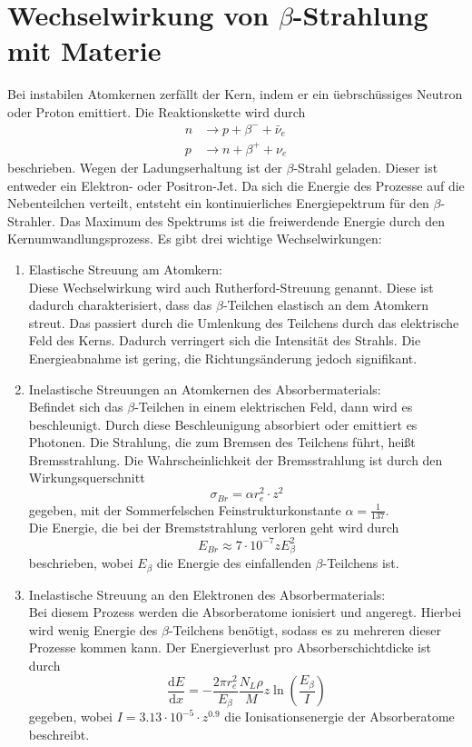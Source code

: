 \section{Wechselwirkung von $\beta$-Strahlung mit Materie}
Bei instabilen Atomkernen zerfällt der Kern, indem er ein üebrschüssiges Neutron oder Proton emittiert. Die Reaktionskette wird durch
\begin{align*}
  n &\rightarrow p+\beta^- + \bar\nu_e\\
  p &\rightarrow n+\beta^+ + \nu_e
\end{align*}
beschrieben. Wegen der Ladungserhaltung ist der $\beta$-Strahl geladen. Dieser ist entweder ein Elektron- oder Positron-Jet. Da sich die Energie des Prozesse auf die Nebenteilchen verteilt, entsteht ein kontinuierliches Energiepektrum für den $\beta$-Strahler. Das Maximum des Spektrums ist die freiwerdende Energie durch den Kernumwandlungsprozess. Es gibt drei wichtige Wechselwirkungen:
\begin{enumerate}[nosep,label=\textsc{\arabic*},leftmargin=*]
\item Elastische Streuung am Atomkern:\\
Diese Wechselwirkung wird auch Rutherford-Streuung genannt. Diese ist dadurch charakterisiert, dass das $\beta$-Teilchen elastisch an dem Atomkern streut. Das passiert durch die Umlenkung des Teilchens durch das elektrische Feld des Kerns. Dadurch verringert sich die Intensität des Strahls. Die Energieabnahme ist gering, die Richtungsänderung jedoch signifikant. 
\item Inelastische Streuungen an Atomkernen des Absorbermaterials:\\
Befindet sich das $\beta$-Teilchen in einem elektrischen Feld, dann wird es beschleunigt. Durch diese Beschleunigung absorbiert oder emittiert es Photonen. Die Strahlung, die zum Bremsen des Teilchens führt, heißt Bremsstrahlung. Die Wahrscheinlichkeit der Bremsstrahlung ist durch den Wirkungsquerschnitt
\begin{equation*}
  \sigma_{Br}=\alpha r_e^2\cdot z^2
\end{equation*}
gegeben, mit der Sommerfelschen Feinstrukturkonstante $\alpha=\frac{1}{137}$.\\
Die Energie, die bei der Bremststrahlung verloren geht wird durch 
\begin{equation*}
  E_{Br}\approx 7\cdot 10^{-7}zE_{\beta}^2
\end{equation*}
beschrieben, wobei $E_\beta$ die Energie des einfallenden $\beta$-Teilchens ist. 
\item Inelastische Streuung an den Elektronen des Absorbermaterials:\\
Bei diesem Prozess werden die Absorberatome ionisiert und angeregt. Hierbei wird wenig Energie des $\beta$-Teilchens benötigt, sodass es zu mehreren dieser Prozesse kommen kann. Der Energieverlust pro Absorberschichtdicke ist durch
\begin{equation*}
  \frac{\textrm{d}E}{\textrm{d}x}=-\frac{2\pi r_e^2}{E_\beta}\frac{N_L \rho}{M}z\ln(\frac{E_\beta}{I})
\end{equation*}
gegeben, wobei $I=3.13\cdot 10^{-5}\cdot z^{0.9}$ die Ionisationsenergie der Absorberatome beschreibt. 
\end{enumerate}
